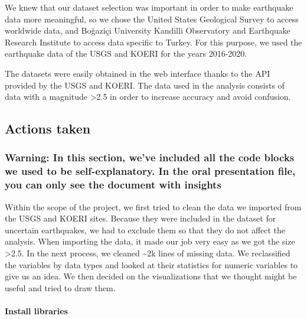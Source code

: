 \documentclass[
]{article}
\begin{document}
We knew that our dataset selection was important in order to make
earthquake data more meaningful, so we chose the United States
Geological Survey to access worldwide data, and Boğaziçi University
Kandilli Observatory and Earthquake Research Institute to access data
specific to Turkey. For this purpose, we used the earthquake data of the
USGS and KOERI for the years 2016-2020.

The datasets were easily obtained in the web interface thanks to the API
provided by the USGS and KOERI. The data used in the analysis consists
of data with a magnitude \textgreater2.5 in order to increase accuracy
and avoid confusion.

\hypertarget{actions-taken}{%
\subsection{Actions taken}\label{actions-taken}}

\hypertarget{warning-in-this-section-weve-included-all-the-code-blocks-we-used-to-be-self-explanatory.-in-the-oral-presentation-file-you-can-only-see-the-document-with-insights}{%
\subsubsection{Warning: In this section, we've included all the code
blocks we used to be self-explanatory. In the oral presentation file,
you can only see the document with
insights}\label{warning-in-this-section-weve-included-all-the-code-blocks-we-used-to-be-self-explanatory.-in-the-oral-presentation-file-you-can-only-see-the-document-with-insights}}

Within the scope of the project, we first tried to clean the data we
imported from the USGS and KOERI sites. Because they were included in
the dataset for uncertain earthquakes, we had to exclude them so that
they do not affect the analysis. When importing the data, it made our
job very easy as we got the size \textgreater2.5. In the next process,
we cleaned \textasciitilde2k lines of missing data. We reclassified the
variables by data types and looked at their statistics for numeric
variables to give us an idea. We then decided on the visualizations that
we thought might be useful and tried to draw them.

\hypertarget{install-libraries}{%
\paragraph{Install libraries}\label{install-libraries}}
\end{document}
